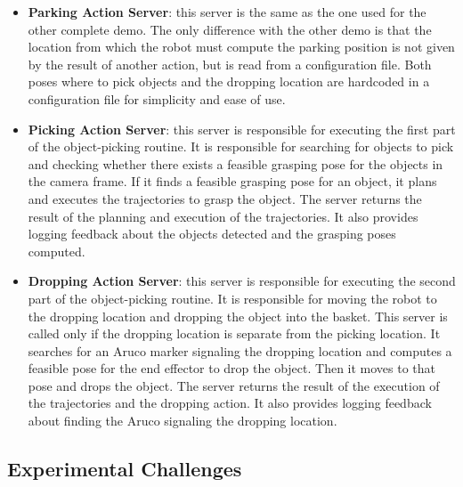 \begin{itemize}
    \item \textbf{Parking Action Server}: this server is the same as the one used for the other complete demo.
    The only difference with the other demo is that the location from which the robot must compute
    the parking position is not given by the result of another action, but is read from a configuration file.
    Both poses where to pick objects and the dropping location are hardcoded in a configuration file for
    simplicity and ease of use.
    \item \textbf{Picking Action Server}: this server is responsible for executing the first part of the
    object-picking routine. It is responsible for searching for objects to pick and checking whether there
    exists a feasible grasping pose for the objects in the camera frame. If it finds a feasible grasping pose
    for an object, it plans and executes the trajectories to grasp the object. The server returns the result
    of the planning and execution of the trajectories. It also provides logging feedback about the objects
    detected and the grasping poses computed.
    \item \textbf{Dropping Action Server}: this server is responsible for executing the second part of the
    object-picking routine. It is responsible for moving the robot to the dropping location and dropping the object
    into the basket. This server is called only if the dropping location is separate from the picking location.
    It searches for an Aruco marker signaling the dropping location and computes a feasible pose for the end effector
    to drop the object. Then it moves to that pose and drops the object.
    The server returns the result of the execution of the trajectories and the dropping action.
    It also provides logging feedback about finding the Aruco signaling the dropping location. 
\end{itemize}

\subsection{Experimental Challenges}

